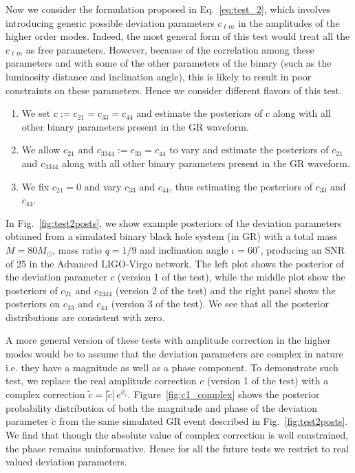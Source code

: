 \documentclass[prd,preprintnumbers,twocolumn,eqsecnum,floatfix,a4paper,nofootinbib,superscriptaddress]{revtex4}
\begin{document}
Now we consider the formulation proposed in Eq.~\eqref{eq:test_2}, which involves introducing generic possible deviation parameters $c_{\ell m}$ in the amplitudes of the higher order modes. Indeed, the most general form of this test would treat all the $c_{\ell m}$ as free parameters. However, because of the correlation among these parameters and with some of the other parameters of the binary (such as the luminosity distance and inclination angle), this is likely to result in poor constraints on these parameters. Hence we consider different flavors of this test. 

\begin{enumerate}
\item We set $c := c_{21} = c_{33} = c_{44}$ and estimate the posteriors of $c$ along with all other binary parameters present in the GR waveform.  
\item We allow $c_{21}$ and $c_{3344} := c_{33} = c_{44} $ to vary and estimate the posteriors of $c_{21}$ and $c_{3344}$ along with all other binary parameters present in the GR waveform.  
\item We fix $c_{21} = 0$ and vary $c_{33}$ and $c_{44}$, thus estimating the posteriors of $c_{33}$ and $c_{44}$. 
\end{enumerate}

In Fig.~\ref{fig:test2posts}, we show example posteriors of the deviation parameters obtained from a simulated binary black hole system (in GR) with  a total mass $M = 80M_{\odot}$, mass ratio $q=1/9$ and inclination angle $ {\iota}=60^{\circ} $, producing an SNR of 25 in the Advanced LIGO-Virgo network. The left plot shows the posterior of the deviation parameter $c$ (version 1 of the test), while the middle plot show the posteriors of $c_{21}$ and $c_{3344}$ (version 2 of the test) and the right panel shows the posteriors on $c_{33}$ and $c_{44}$  (version 3 of the test). We see that all the posterior distributions are consistent with zero. 

A more general version of these tests with amplitude correction in the higher modes would be to assume that the deviation parameters are complex in nature i.e. they have a magnitude as well as a phase component. To demonstrate such test, we replace the real amplitude correction $c$ (version 1 of the test) with a complex correction $\tilde{c} = |\tilde{c}| \, e^{\phi_c}$. Figure~\ref{fig:c1_complex} shows the posterior probability distribution of both the magnitude and phase of the deviation parameter $\tilde{c}$ from the same simulated GR event described in Fig.~\ref{fig:test2posts}. We find that though the absolute value of complex correction is well constrained, the phase remains uninformative. Hence for all the future tests we restrict to real valued deviation parameters. 
\end{document}
